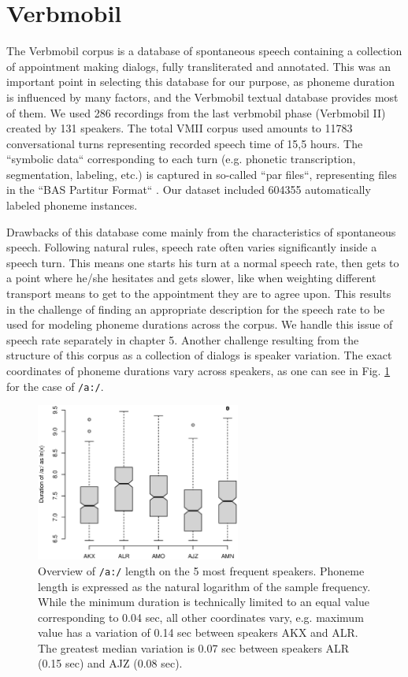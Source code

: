 \documentclass[a4paper]{scrreprt}
\begin{document}
\section{Verbmobil}
The Verbmobil corpus is a database of spontaneous speech containing a collection of appointment making dialogs, fully transliterated and annotated. This was an important point in selecting this database for our purpose, as phoneme duration is influenced by many factors, and the Verbmobil textual database provides most of them. We used 286 recordings from the last verbmobil phase (Verbmobil II) created by 131 speakers. The total VMII corpus used amounts to 11783 conversational turns representing recorded speech time of 15,5 hours. The ``symbolic data`` corresponding to each turn (e.g. phonetic transcription, segmentation, labeling, etc.) is captured in so-called ``par files``, representing files in the ``BAS Partitur Format`` \cite{Burger2000}. Our dataset included 604355 automatically labeled phoneme instances.

Drawbacks of this database come mainly from the characteristics of spontaneous speech. Following natural rules, speech rate often varies significantly inside a speech turn. This means one starts his turn at a normal speech rate, then gets to a point where he/she hesitates and gets slower, like when weighting different transport means to get to the appointment they are to agree upon. This results in the challenge of finding an appropriate description for the speech rate to be used for modeling phoneme durations across the corpus. We handle this issue of speech rate separately in chapter 5. Another challenge resulting from the structure of this corpus as a collection of dialogs is speaker variation. The exact coordinates of phoneme durations vary across speakers, as one can see in Fig. \ref{fig:speaker_cmp} for the case of \texttt{/a:/}.

\begin{figure}[htbp]
	\includegraphics[width=0.6\textwidth]{../Graphen/Duration_of_a_5speakers.eps}
	\centering
	\caption[Phoneme length variation between speakers]{Overview of \texttt{/a:/} length on the 5 most frequent speakers. Phoneme length is expressed as the natural logarithm of the sample frequency. While the minimum duration is technically limited to an equal value corresponding to 0.04 sec, all other coordinates vary, e.g. maximum value has a variation of 0.14 sec between speakers AKX and ALR. The greatest median variation is 0.07 sec between speakers ALR (0.15 sec) and AJZ (0.08 sec).}
	\label{fig:speaker_cmp}
\end{figure}
\end{document}

